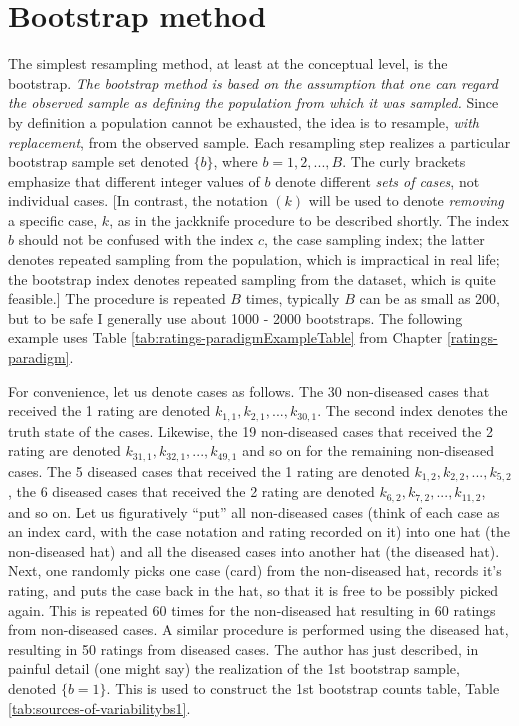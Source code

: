 \documentclass[
]{book}
\begin{document}
\hypertarget{sources-of-variabilityBootstrap}{%
\section{Bootstrap method}\label{sources-of-variabilityBootstrap}}

The simplest resampling method, at least at the conceptual level, is the bootstrap. \emph{The bootstrap method is based on the assumption that one can regard the observed sample as defining the population from which it was sampled.} Since by definition a population cannot be exhausted, the idea is to resample, \emph{with replacement}, from the observed sample. Each resampling step realizes a particular bootstrap sample set denoted \(\{b\}\), where \(b = 1, 2, ..., B\). The curly brackets emphasize that different integer values of \(b\) denote different \emph{sets of cases}, not individual cases. {[}In contrast, the notation \((k)\) will be used to denote \emph{removing} a specific case, \(k\), as in the jackknife procedure to be described shortly. The index \(b\) should not be confused with the index \(c\), the case sampling index; the latter denotes repeated sampling from the population, which is impractical in real life; the bootstrap index denotes repeated sampling from the dataset, which is quite feasible.{]} The procedure is repeated \(B\) times, typically \(B\) can be as small as 200, but to be safe I generally use about 1000 - 2000 bootstraps. The following example uses Table \ref{tab:ratings-paradigmExampleTable} from Chapter \ref{ratings-paradigm}.

For convenience, let us denote cases as follows. The 30 non-diseased cases that received the 1 rating are denoted \(k_{1,1},k_{2,1},...,k_{30,1}\). The second index denotes the truth state of the cases. Likewise, the 19 non-diseased cases that received the 2 rating are denoted \(k_{31,1},k_{32,1},...,k_{49,1}\) and so on for the remaining non-diseased cases. The 5 diseased cases that received the 1 rating are denoted \(k_{1,2},k_{2,2},...,k_{5,2}\), the 6 diseased cases that received the 2 rating are denoted \(k_{6,2},k_{7,2},...,k_{11,2}\), and so on. Let us figuratively ``put'' all non-diseased cases (think of each case as an index card, with the case notation and rating recorded on it) into one hat (the non-diseased hat) and all the diseased cases into another hat (the diseased hat). Next, one randomly picks one case (card) from the non-diseased hat, records it's rating, and puts the case back in the hat, so that it is free to be possibly picked again. This is repeated 60 times for the non-diseased hat resulting in 60 ratings from non-diseased cases. A similar procedure is performed using the diseased hat, resulting in 50 ratings from diseased cases. The author has just described, in painful detail (one might say) the realization of the 1st bootstrap sample, denoted \(\{b=1\}\). This is used to construct the 1st bootstrap counts table, Table \ref{tab:sources-of-variabilitybs1}.
\end{document}
